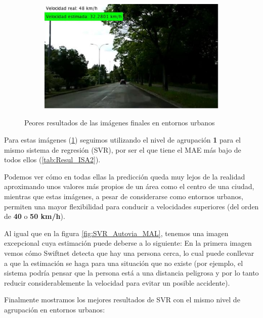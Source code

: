\begin{figure}[H]
\begin{subfigure}[b]{0.475\linewidth}
  \end{subfigure}
  \begin{subfigure}[b]{0.475\linewidth}
    \includegraphics[width=\linewidth]{Figuras/Resultado_SVR_Urbano_MAL_4.eps}
  \end{subfigure}
  \caption{Peores resultados de las imágenes finales en entornos urbanos}
  \label{fig:SVR_Urbano_MAL}
\end{figure}

Para estas imágenes (\ref{fig:SVR_Urbano_MAL}) seguimos utilizando el nivel de agrupación \textbf{1} para el mismo sistema de regresión (\ac{SVR}), por ser el que tiene el \ac{MAE} más bajo de todos ellos (\ref{tab:Resul_ISA2}).

Podemos ver cómo en todas ellas la predicción queda muy lejos de la realidad aproximando unos valores más propios de un área como el centro de una ciudad, mientras que estas imágenes, a pesar de considerarse como entornos urbanos, permiten una mayor flexibilidad para conducir a velocidades superiores (del orden de \textbf{40} o \textbf{50 km/h}).

Al igual que en la figura \ref{fig:SVR_Autovia_MAL}, tenemos una imagen excepcional cuya estimación puede deberse a lo siguiente: En la primera imagen vemos cómo Swiftnet detecta que hay una persona cerca, lo cual puede conllevar a que la estimación se haga para una situación que no existe (por ejemplo, el sistema podría pensar que la persona está a una distancia peligrosa y por lo tanto reducir considerablemente la velocidad para evitar un posible accidente).

Finalmente mostramos los mejores resultados de \ac{SVR} con el mismo nivel de agrupación en entornos urbanos:

